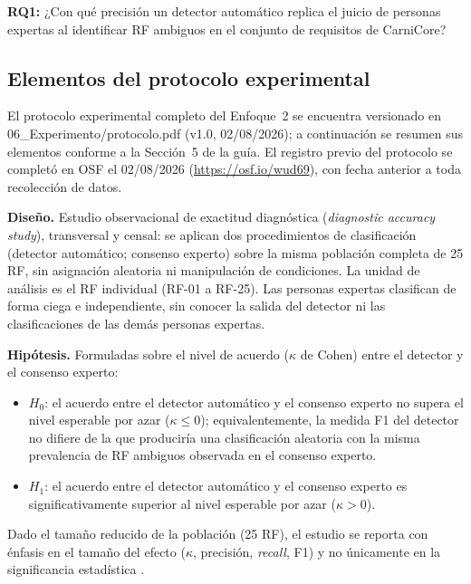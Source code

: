 \documentclass[11pt,a4paper]{article}
\begin{document}
\textbf{RQ1:} ¿Con qué precisión un detector automático replica el juicio de personas expertas al identificar RF ambiguos en el conjunto de requisitos de CarniCore?

\subsection{Elementos del protocolo experimental}
El protocolo experimental completo del Enfoque~2 se encuentra versionado en 06\_Experimento/protocolo.pdf (v1.0, 02/08/2026); a continuación se resumen sus elementos conforme a la Sección~5 de la guía. El registro previo del protocolo se completó en OSF el 02/08/2026 (\url{https://osf.io/wud69}), con fecha anterior a toda recolección de datos.

\textbf{Diseño.} Estudio observacional de exactitud diagnóstica (\textit{diagnostic accuracy study}), transversal y censal: se aplican dos procedimientos de clasificación (detector automático; consenso experto) sobre la misma población completa de 25 RF, sin asignación aleatoria ni manipulación de condiciones. La unidad de análisis es el RF individual (RF-01 a RF-25). Las personas expertas clasifican de forma ciega e independiente, sin conocer la salida del detector ni las clasificaciones de las demás personas expertas.

\textbf{Hipótesis.} Formuladas sobre el nivel de acuerdo (\(\kappa\) de Cohen) entre el detector y el consenso experto:
\begin{itemize}[nosep]
\item \(H_0\): el acuerdo entre el detector automático y el consenso experto no supera el nivel esperable por azar (\(\kappa \leq 0\)); equivalentemente, la medida F1 del detector no difiere de la que produciría una clasificación aleatoria con la misma prevalencia de RF ambiguos observada en el consenso experto.
\item \(H_1\): el acuerdo entre el detector automático y el consenso experto es significativamente superior al nivel esperable por azar (\(\kappa > 0\)).
\end{itemize}
Dado el tamaño reducido de la población (25 RF), el estudio se reporta con énfasis en el tamaño del efecto (\(\kappa\), precisión, \textit{recall}, F1) y no únicamente en la significancia estadística \cite{wohlin2012experimentation}.
\end{document}
